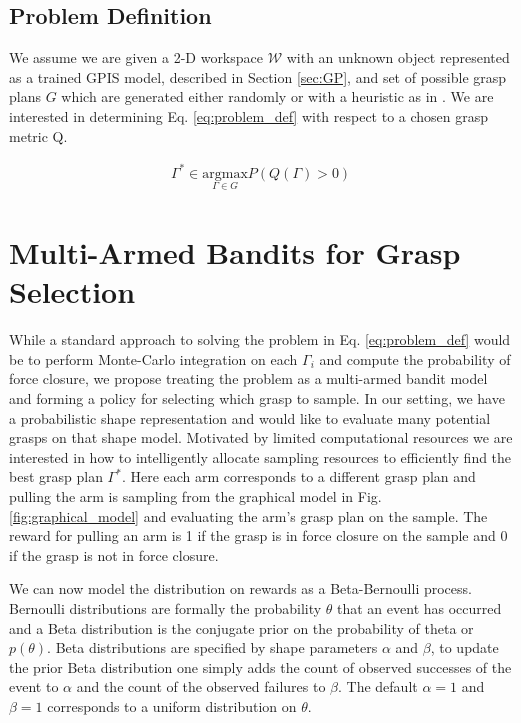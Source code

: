 \documentclass[letterpaper, 10 pt, conference]{ieeeconf}  %
\begin{document}
\subsection{Problem Definition}

We assume we are given a 2-D workspace $\mathcal{W}$ with an unknown object represented as a trained GPIS model, described in Section \ref{sec:GP}, and set of possible grasp plans $G$ which are generated either randomly or with a heuristic as in \cite{mahler2015gp}.
We are interested in determining Eq. \ref{eq:problem_def} with respect to a chosen grasp metric Q. 

\vspace{-2ex}
\begin{align}\label{eq:problem_def}
\Gamma^* \in \underset{\Gamma \in G}{\mbox{argmax}} P(Q(\Gamma)>0)
\end{align}

\section{Multi-Armed Bandits for Grasp Selection}
While a standard approach to solving the problem in Eq. \ref{eq:problem_def} would be to perform Monte-Carlo integration on each $\Gamma_i$ and compute the probability of force closure, we propose treating the problem as a multi-armed bandit model and forming a policy for selecting which grasp to sample. 
In our setting, we have a probabilistic shape representation and would like to evaluate many potential grasps on that shape model.
Motivated by limited computational resources we are interested in how to intelligently allocate sampling resources to efficiently find the best grasp plan $\Gamma^*$.
Here each arm corresponds to a different grasp plan and pulling the arm is sampling from the graphical model in Fig. \ref{fig:graphical_model} and evaluating the arm's grasp plan on the sample.
The reward for pulling an arm is 1 if the grasp is in force closure on the sample and 0 if the grasp is not in force closure. 

We can now model the distribution on rewards as a Beta-Bernoulli process. Bernoulli distributions are formally the probability $\theta$ that an event has occurred and a Beta distribution is the conjugate prior on the probability of theta or $p(\theta)$. Beta distributions are specified by shape parameters $\alpha$ and $\beta$, to update the prior Beta distribution one simply adds the count of observed successes of the event to $\alpha$ and the count of the observed failures to $\beta$. The default $\alpha =1 $ and $\beta =1$ corresponds to a uniform distribution on $\theta$. 
\end{document}

